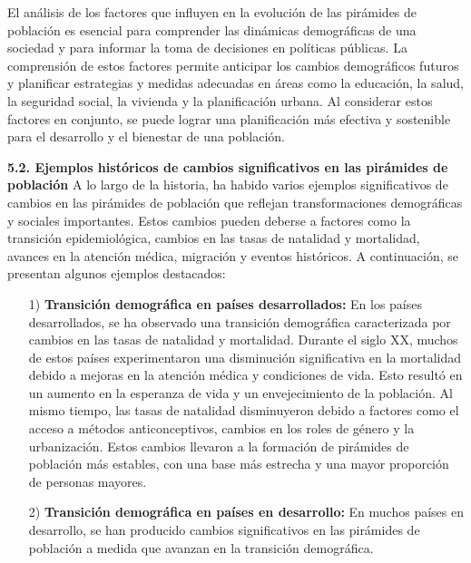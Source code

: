 \documentclass[8pt,a4paper]{beamer}
\begin{document}
{\begin{frame}{}
\begin{block}{}
El análisis de los factores que influyen en la evolución de las pirámides de población es esencial para comprender las dinámicas demográficas de una sociedad y para informar la toma de decisiones en políticas públicas. La comprensión de estos factores permite anticipar los cambios demográficos futuros y planificar estrategias y medidas adecuadas en áreas como la educación, la salud, la seguridad social, la vivienda y la planificación urbana. Al considerar estos factores en conjunto, se puede lograr una planificación más efectiva y sostenible para el desarrollo y el bienestar de una población.
\end{block}
\end{frame}


\begin{frame}{}
\begin{block}{\textbf{5.2. Ejemplos históricos de cambios significativos en las pirámides de población}}
\justifying
A lo largo de la historia, ha habido varios ejemplos significativos de cambios en las pirámides de población que reflejan transformaciones demográficas y sociales importantes. Estos cambios pueden deberse a factores como la transición epidemiológica, cambios en las tasas de natalidad y mortalidad, avances en la atención médica, migración y eventos históricos. A continuación, se presentan algunos ejemplos destacados:
\begin{enumerate}
\justifying

\item[1)] \textbf{Transición demográfica en países desarrollados:} En los países desarrollados, se ha observado una transición demográfica caracterizada por cambios en las tasas de natalidad y mortalidad. Durante el siglo XX, muchos de estos países experimentaron una disminución significativa en la mortalidad debido a mejoras en la atención médica y condiciones de vida. Esto resultó en un aumento en la esperanza de vida y un envejecimiento de la población. Al mismo tiempo, las tasas de natalidad disminuyeron debido a factores como el acceso a métodos anticonceptivos, cambios en los roles de género y la urbanización. Estos cambios llevaron a la formación de pirámides de población más estables, con una base más estrecha y una mayor proporción de personas mayores.

\item[2)] \textbf{Transición demográfica en países en desarrollo:} En muchos países en desarrollo, se han producido cambios significativos en las pirámides de población a medida que avanzan en la transición demográfica.
\end{enumerate}
\end{block}
\end{frame}


}
\end{document}
